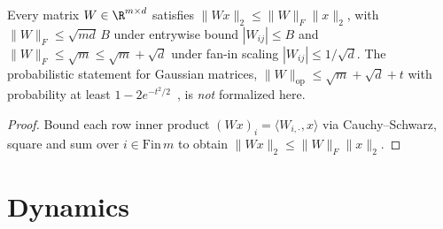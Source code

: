 \begin{lemma}\label{lem:gaussian_operator_norm}
\leanok
{}
Every matrix $W\in\R^{m\times d}$ satisfies $\|Wx\|_2 \le \|W\|_F\|x\|_2$, with $\|W\|_F \le \sqrt{md}\,B$ under entrywise bound $|W_{ij}|\le B$ and $\|W\|_F \le \sqrt{m} \le \sqrt{m}+\sqrt{d}$ under fan-in scaling $|W_{ij}|\le 1/\sqrt{d}$. The probabilistic statement for Gaussian matrices, $\|W\|_{\mathrm{op}} \le \sqrt{m}+\sqrt{d}+t$ with probability at least $1-2e^{-t^2/2}$~\cite{vershynin2018high}, is \emph{not} formalized here.
\end{lemma}
\begin{proof}
\leanok
Bound each row inner product $(Wx)_i = \langle W_{i,\cdot}, x\rangle$ via Cauchy--Schwarz, square and sum over $i\in\mathrm{Fin}\,m$ to obtain $\|Wx\|_2 \le \|W\|_F\|x\|_2$.
\end{proof}

\chapter{Dynamics}

